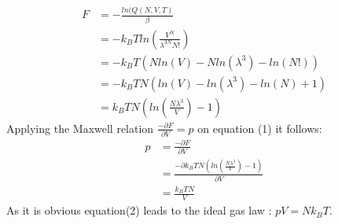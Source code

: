 \documentclass[12pt,a4paper]{scrartcl}
\begin{document}
 \begin{align}
 F&= -\frac{ln(Q(N,V,T)}{\beta}\nonumber\\
 &= -k_BT  ln\left(\frac{V^N}{\lambda^{3N}N!}\right)\nonumber\\
 &= -k_BT\left(N ln(V) - N ln(\lambda^{3}) - ln(N!)\right)\nonumber\\
 &= -k_BTN\left(ln(V) - ln(\lambda^{3}) -ln(N) + 1\right)\nonumber\\
 &= k_BTN\left(ln\left(\frac{N\lambda^3}{V}\right)-1\right)
 \end{align}
 Applying the Maxwell relation $\frac{-\partial F}{\partial V}=p$ on equation (1) it follows:\\
  \begin{align}
 p&=\frac{-\partial F}{\partial V} \nonumber\\
 &=\frac{-\partial k_BTN\left(ln\left(\frac{N\lambda^3}{V}\right)-1\right) }{\partial V}\nonumber\\
 &=\frac{k_BTN}{V}
 \end{align}
As it is obvious equation(2) leads to the ideal gas law : $pV=Nk_BT$.
\end{document}

